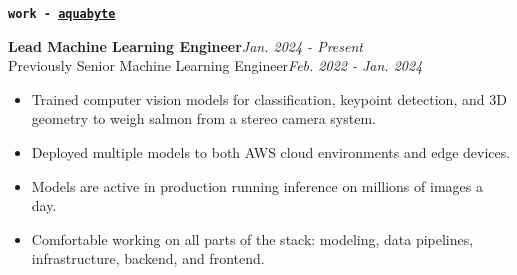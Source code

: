 \documentclass{article}[14pt]
\newenvironment{cvsection}[2] {
  \begin{tcolorbox}[
    standard jigsaw, %
    opacityback=0,   %
    top=0mm,         %
    bottom=0mm,      %
    boxrule=0pt,     %
    enhanced,        %
    frame code={
      \path[draw=#2,line width=3pt]
        (frame.south west) --
        ([yshift=-0.29cm] frame.north west) --
        ([yshift=-0.29cm, xshift=0.2\linewidth] frame.north west);
    }
  ]
  \hspace{0.20\linewidth}
  \textbf{\texttt{\Large{#1}}}
  \large
  \vspace{5pt}
  \newline
}
{ \end{tcolorbox} }
\newenvironment{tightemize}
{\vspace{-2pt}\begin{itemize}[leftmargin=*]\itemsep4pt \parskip0pt \parsep0pt}
{\end{itemize}}
\newcommand{\role}[2]{{\large\textbf{#1}\hfill\textit{#2}}}
\newcommand{\pastrole}[2]{{Previously #1\hfill\textit{#2}}}
\begin{document}
\vspace{1pt}
\begin{cvsection}{work - \href{https://aquabyte.ai/}{aquabyte}}{C1}
  \role{Lead Machine Learning Engineer}{Jan. 2024 - Present}\\
  \pastrole{Senior Machine Learning Engineer}{Feb. 2022 - Jan. 2024}
  \begin{tightemize}
    \item Trained computer vision models for classification, keypoint detection, and
      3D geometry to weigh salmon from a stereo camera system.
    \item Deployed multiple models to both AWS cloud environments and edge devices.
    \item Models are active in production running inference on millions of images a day.
    \item Comfortable working on all parts of the stack: modeling, data pipelines, infrastructure, backend, and frontend.






  \end{tightemize}
\end{cvsection}
\end{document}
